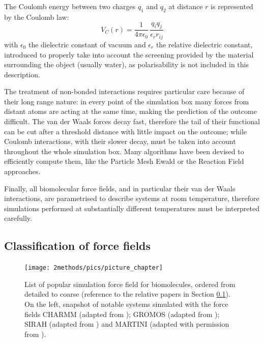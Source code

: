 The Coulomb energy between two charges $q_1$ and $q_2$ at distance $r$ is represented by the Coulomb law:
\begin{equation}
V_C(r) = \frac{1}{4 \pi \epsilon_0} \, \frac{q_i q_j}{\epsilon_r r_{ij}}
\end{equation}
with $\epsilon_0$ the dielectric constant of vacuum and $\epsilon_r$ the relative dielectric constant, introduced to properly take into account the screening provided by the material surrounding the object (usually water), as polarisability is not included in this description.

The treatment of non-bonded interactions requires particular care because of their long range nature: in every point of the simulation box many forces from distant atoms are acting at the same time, making the prediction of the outcome difficult.
%
The van der Waals forces decay fast, therefore the tail of their functional can be cut after a threshold distance with little impact on the outcome; while Coulomb interactions, with their slower decay, must be taken into account throughout the whole simulation box. Many algorithms have been devised to efficiently compute them, like the Particle Mesh Ewald \citep{Essmann1995} or the Reaction Field \citep{Tironi1995} approaches. 

Finally, all biomolecular force fields, and in particular their van der Waals interactions, are parametrised to describe systems at room temperature, therefore simulations performed at substantially different temperatures must be interpreted carefully.


\subsection{Classification of force fields} \label{sec:ff_ex}

\begin{figure}
\centering
\texttt{[image: 2methods/pics/picture\_chapter]}
%
\caption[Scheme of popular simulation force field for biomolecules]{List of popular simulation force field for biomolecules, ordered from detailed to coarse (reference to the relative papers in Section \ref{sec:ff_ex}). On the left, snapshot of notable systems simulated with the force fields CHARMM (adapted from \citet{Lipkin2017}); GROMOS (adapted from \citet{Macpherson2019}); SIRAH (adapted from \citet{Machado2017}) and MARTINI (adapted with permission from \citet{Samsudin2017}).}
\label{fig:ff}
\end{figure}


